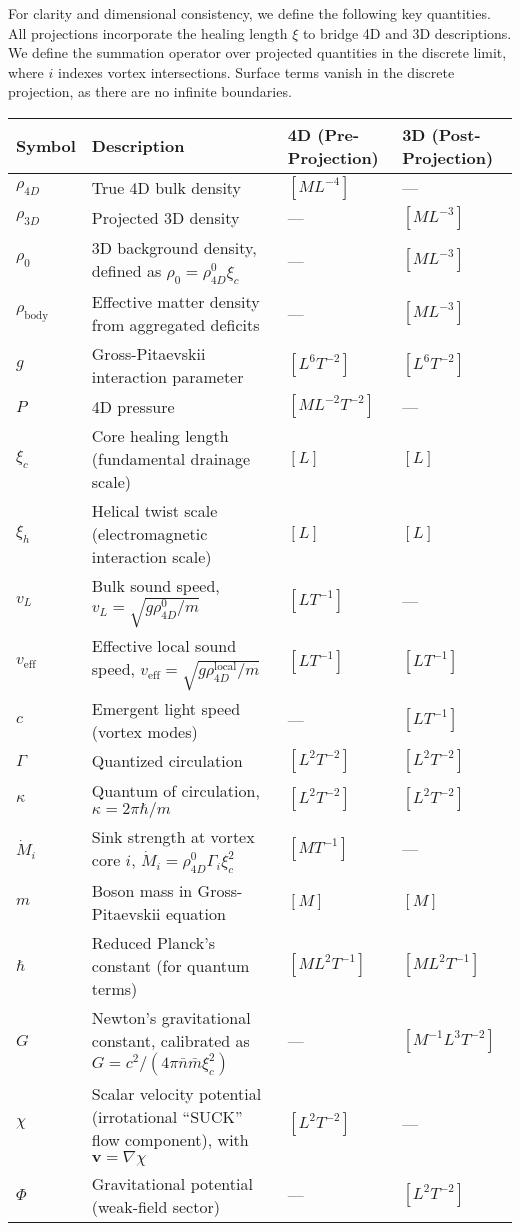 For clarity and dimensional consistency, we define the following key quantities. All projections incorporate the healing length $\xi$ to bridge 4D and 3D descriptions. We define the summation operator over projected quantities in the discrete limit, where $i$ indexes vortex intersections. Surface terms vanish in the discrete projection, as there are no infinite boundaries.

\begin{table}[H]
\centering
\begin{tabularx}{\textwidth}{|l|Y|l|l|}
\hline
Symbol & Description & 4D (Pre-Projection) & 3D (Post-Projection) \\
\hline
$\rho_{4D}$ & True 4D bulk density & $[M L^{-4}]$ & --- \\
\hline
$\rho_{3D}$ & Projected 3D density & --- & $[M L^{-3}]$ \\
\hline
$\rho_0$ & 3D background density, defined as $\rho_0 = \rho_{4D}^0 \xi_c$ & --- & $[M L^{-3}]$ \\
\hline
$\rho_{\text{body}}$ & Effective matter density from aggregated deficits & --- & $[M L^{-3}]$ \\
\hline
$g$ & Gross-Pitaevskii interaction parameter & $[L^6 T^{-2}]$ & $[L^6 T^{-2}]$ \\
\hline
$P$ & 4D pressure & $[M L^{-2} T^{-2}]$ & --- \\
\hline
$\xi_c$ & Core healing length (fundamental drainage scale) & $[L]$ & $[L]$ \\
\hline
$\xi_h$ & Helical twist scale (electromagnetic interaction scale) & $[L]$ & $[L]$ \\
\hline
$v_L$ & Bulk sound speed, $v_L = \sqrt{g \rho_{4D}^0 / m}$ & $[L T^{-1}]$ & --- \\
\hline
$v_{\text{eff}}$ & Effective local sound speed, $v_{\text{eff}} = \sqrt{g \rho_{4D}^{\text{local}} / m}$ & $[L T^{-1}]$ & $[L T^{-1}]$ \\
\hline
$c$ & Emergent light speed (vortex modes) & --- & $[L T^{-1}]$ \\
\hline
$\Gamma$ & Quantized circulation & $[L^2 T^{-2}]$ & $[L^2 T^{-2}]$ \\
\hline
$\kappa$ & Quantum of circulation, $\kappa = 2 \pi \hbar / m$ & $[L^2 T^{-2}]$ & $[L^2 T^{-2}]$ \\
\hline
$\dot{M}_i$ & Sink strength at vortex core $i$, $\dot{M}_i = \rho_{4D}^0 \Gamma_i \xi_c^2$ & $[M T^{-1}]$ & --- \\
\hline
$m$ & Boson mass in Gross-Pitaevskii equation & $[M]$ & $[M]$ \\
\hline
$\hbar$ & Reduced Planck's constant (for quantum terms) & $[M L^2 T^{-1}]$ & $[M L^2 T^{-1}]$ \\
\hline
$G$ & Newton's gravitational constant, calibrated as $G = c^2 / (4\pi \bar{n} \bar{m} \xi_c^2)$ & --- & $[M^{-1} L^3 T^{-2}]$ \\
\hline
$\chi$ & Scalar velocity potential (irrotational ``SUCK'' flow component), with $\mathbf v=\nabla\chi$ & $[L^2 T^{-2}]$ & --- \\
\hline
$\Phi$ & Gravitational potential (weak-field sector) & --- & $[L^2 T^{-2}]$ \\
\hline


\end{tabularx}
\end{table}
